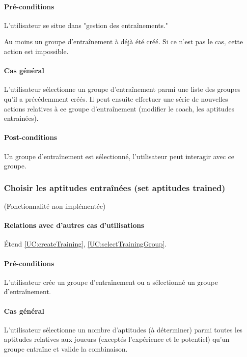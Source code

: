 \paragraph{Pré-conditions}
\begin{list}{}{\leftmargin=1.5em}
\item{L'utilisateur se situe dans "gestion des entraînements."}
\item{Au moins un groupe d'entraînement à déjà été créé. Si ce n'est pas le cas, cette action est impossible.}
\end{list}
\paragraph{Cas général}
L'utilisateur sélectionne un groupe d'entraînement parmi une liste des groupes qu'il a précédemment créés. Il peut ensuite effectuer une série de nouvelles actions relatives à ce groupe d'entraînement (modifier le coach, les aptitudes entrainées).
\paragraph{Post-conditions}
\begin{list}{}{\leftmargin=1.5em}
\item{Un groupe d'entraînement est sélectionné, l'utilisateur peut interagir avec ce groupe.}
\end{list}

\subsubsection{Choisir les aptitudes entraînées (set aptitudes trained)}
\label{UC:chooseAptitudesTrained}
(Fonctionnalité non implémentée)
\paragraph{Relations avec d'autres cas d'utilisations}
Étend \ref{UC:createTraining}, \ref{UC:selectTrainingGroup}.
\paragraph{Pré-conditions}
\begin{list}{}{\leftmargin=1.5em}
\item{L'utilisateur crée un groupe d'entraînement ou a sélectionné un groupe d'entraînement.}
\end{list}
\paragraph{Cas général}
L'utilisateur sélectionne un nombre d'aptitudes (à déterminer) parmi toutes les aptitudes relatives aux joueurs (exceptés l'expérience et le potentiel) qu'un groupe entraîne et valide la combinaison. 
